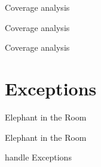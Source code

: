 \documentclass[aspectratio=169,notes]{beamer}
\begin{document}
	\begin{frame}[fragile]{Coverage analysis}
		
	\end{frame}

	\begin{frame}[fragile]{Coverage analysis}
		\mbox{}\\[2cm]
		
	\end{frame}

	\begin{frame}[fragile]{Coverage analysis}
		
	\end{frame}

	\section{Exceptions}
	{
	\begin{frame}[fragile]{Elephant in the Room}
	\end{frame}
	}

	\begin{frame}[fragile]{Elephant in the Room}
		
	\end{frame}

	\begin{frame}[fragile]{handle Exceptions}
		
	\end{frame}
\end{document}
